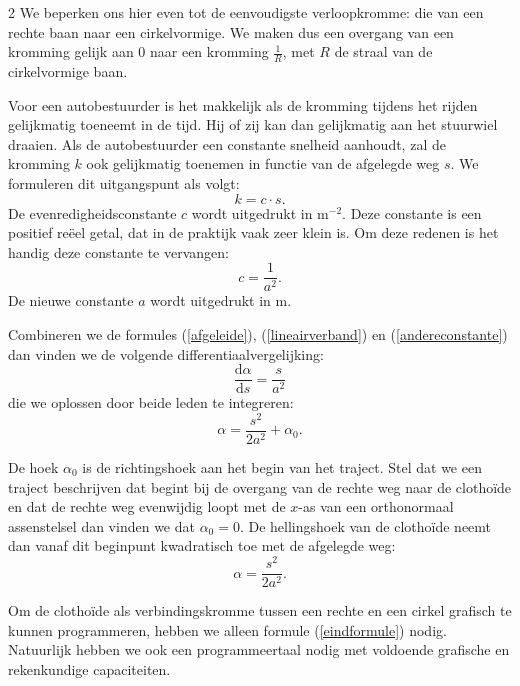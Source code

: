 \begin{multicols}{2}
We beperken ons hier even tot de eenvoudigste verloopkromme: die van een rechte baan naar een cirkelvormige. We maken dus een overgang van een kromming  gelijk aan 0 naar een kromming $\frac{1}{R}$, met $R$ de straal van de cirkelvormige baan. 

Voor een autobestuurder is het makkelijk als de kromming tijdens het rijden gelijkmatig toeneemt in de tijd. Hij of zij kan dan gelijkmatig aan het stuurwiel draaien. Als de autobestuurder een constante snelheid aanhoudt, zal de kromming $k$ ook gelijkmatig toenemen in functie van de afgelegde weg $s$. We formuleren dit uitgangspunt als volgt:
\begin{equation} k=c \cdot s.\label{lineairverband} \end{equation}
De evenredigheidsconstante $c$ wordt uitgedrukt in $\textrm{m}^{-2}$. Deze constante is een positief reëel getal, dat in de praktijk vaak zeer klein is. Om deze redenen is het handig deze constante te vervangen:
\begin{equation} c=\frac{1}{a^2}.\label{andereconstante} \end{equation}
De nieuwe constante $a$ wordt uitgedrukt in m.

Combineren we de formules (\ref{afgeleide}), (\ref{lineairverband}) en (\ref{andereconstante}) dan vinden we de volgende differentiaalvergelijking:
\begin{equation} \frac{\textrm{d} \alpha}{\textrm{d} s}=\frac{s}{a^2} \label{differentiaalvergelijking} \end{equation}
die we oplossen door beide leden te integreren:
\begin{equation} \alpha =\frac{s^2}{2a^2} +\alpha_0. \end{equation}

De hoek $\alpha_0$ is de richtingshoek aan het begin van het traject. Stel dat we een traject beschrijven dat begint bij de overgang van de rechte weg naar de clothoïde en dat de rechte weg evenwijdig loopt met de $x$-as van een orthonormaal assenstelsel dan vinden we dat $\alpha_0=0$. De hellingshoek van de clothoïde neemt dan vanaf dit beginpunt kwadratisch toe met de afgelegde weg:
\begin{equation} \alpha =\frac{s^2}{2a^2}. \label{eindformule} \end{equation}

Om de clothoïde als verbindingskromme tussen een rechte en een cirkel grafisch te kunnen programmeren, hebben we alleen formule (\ref{eindformule}) nodig. Natuurlijk hebben we ook een programmeertaal nodig met voldoende grafische en rekenkundige capaciteiten.


\end{multicols}
